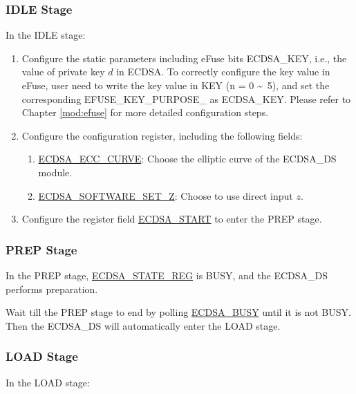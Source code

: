 \documentclass[main\_\_EN.tex]{subfiles}
\begin{document}
\subsubsection{IDLE Stage}
In the IDLE stage:
\begin{enumerate}
	\item Configure the static parameters including eFuse bits ECDSA\_KEY, i.e., the value of private key $d$ in ECDSA. To correctly configure the key value in eFuse, user need to write the key value in KEY (n = 0 \textasciitilde \ 5), and set the corresponding EFUSE\_KEY\_PURPOSE\_ as ECDSA\_KEY. Please refer to Chapter \ref{mod:efuse} \textit{} for more detailed configuration steps.
	\item Configure the configuration register, including the following fields:
	      \begin{enumerate}
		      \item \hyperref[fielddesc:ECDSAECCCURVE]{ECDSA\_ECC\_CURVE}: Choose the elliptic curve of the ECDSA\_DS module.
		      \item \hyperref[fielddesc:ECDSASOFTWARESETZ]{ECDSA\_SOFTWARE\_SET\_Z}: Choose to use direct input $z$.
	      \end{enumerate}
	\item Configure the register field \hyperref[fielddesc:ECDSASTART]{ECDSA\_START} to enter the PREP stage.
\end{enumerate}

\subsubsection{PREP Stage}

In the PREP stage, \hyperref[regdesc:ECDSASTATEREG]{ECDSA\_STATE\_REG} is BUSY, and the ECDSA\_DS performs preparation.

Wait till the PREP stage to end by polling \hyperref[fielddesc:ECDSABUSY]{ECDSA\_BUSY} until it is not BUSY. Then the ECDSA\_DS will automatically enter the LOAD stage.

\subsubsection{LOAD Stage}
In the LOAD stage:
\end{document}
